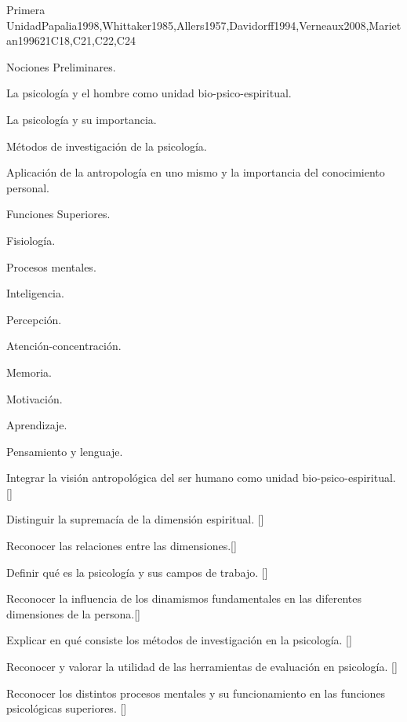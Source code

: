 \begin{syllabus}
\begin{unit}{}{Primera Unidad}{Papalia1998,Whittaker1985,Allers1957,Davidorff1994,Verneaux2008,Marietan1996}{21}{C18,C21,C22,C24}
\begin{topics}
	\item Nociones Preliminares.
	      \begin{subtopics}
		\item La psicología y el hombre como unidad bio-psico-espiritual.
		\item La psicología y su importancia.
		\item Métodos de investigación de la psicología.
		\item Aplicación de la antropología en uno mismo y la importancia del conocimiento personal.
	      \end{subtopics}
	\item Funciones Superiores.
	      \begin{subtopics}
		\item Fisiología.
		\item Procesos mentales.
		    \begin{subtopics}
			\item	Inteligencia.
			\item Percepción.
			\item Atención-concentración.
			\item Memoria.
			\item Motivación.
			\item Aprendizaje.
			\item Pensamiento y lenguaje.
		    \end{subtopics}    
	      \end{subtopics}

\end{topics}
\begin{learningoutcomes}
	\item Integrar la visión antropológica del ser humano como unidad bio-psico-espiritual. [\Usage]
	\item Distinguir la supremacía de la dimensión espiritual. [\Familiarity]
	\item Reconocer las relaciones entre las dimensiones.[\Familiarity]
	\item Definir qué es la psicología y sus campos de trabajo. [\Familiarity]
	\item Reconocer la influencia de los dinamismos fundamentales en las diferentes dimensiones de la persona.[\Familiarity]
	\item Explicar en qué consiste los métodos de investigación en la psicología. [\Familiarity]
	\item Reconocer y valorar la utilidad de las herramientas de evaluación en psicología. [\Familiarity]
	\item Reconocer los distintos procesos mentales y su funcionamiento en las funciones psicológicas superiores. [\Familiarity]
\end{learningoutcomes}
\end{unit}


\end{syllabus}
